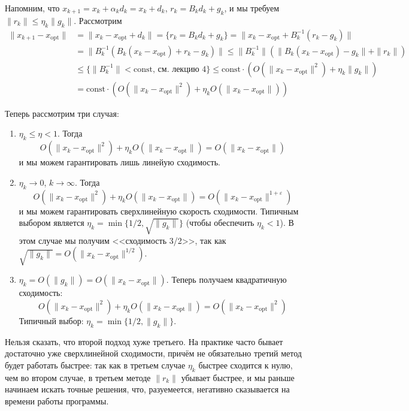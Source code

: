 \documentclass[a4paper, 12pt]{article}
\begin{document}
Напомним, что $x_{k+1} = x_k + \alpha_k d_k = x_k + d_k$, $r_k = B_kd_k + g_k$, и мы требуем $\|r_k\| \leq \eta_k\|g_k\|$. Рассмотрим
\begin{align}
    \|x_{k+1} - x_{\mathrm{opt}}\| &= \|x_k - x_{\mathrm{opt}} + d_k\|  
    = \{r_k = B_kd_k + g_k\} = \|x_k - x_{\mathrm{opt}} + B_k^{-1}(r_k - g_k)\| \\ &= \|B_k^{-1}(B_k(x_k - x_{\mathrm{opt}}) + r_k - g_k)\| 
    \leq \|B_k^{-1}\| (\|B_k(x_k - x_{\mathrm{opt}}) - g_k\| + \|r_k\|) \\ &\leq 
    \{\|B_k^{-1}\| < \mathrm{const} \text{, см. лекцию 4}\} \leq \mathrm{const} \cdot (O(\|x_k - x_{\mathrm{opt}}\|^2) + \eta_k \|g_k\|) \\ &= \mathrm{const} \cdot (O(\|x_k - x_{\mathrm{opt}}\|^2) + \eta_k O(\|x_k - x_{\mathrm{opt}}\|))
\end{align}

Теперь рассмотрим три случая:
\begin{enumerate}
    \item $\eta_k \leq \eta < 1$. Тогда $$O(\|x_k - x_{\mathrm{opt}}\|^2) + \eta_k O(\|x_k - x_{\mathrm{opt}}\|) = O(\|x_k - x_{\mathrm{opt}}\|)$$ и мы можем гарантировать лишь линейую сходимость.
    \item $\eta_k \to 0$, $k \to \infty$. Тогда 
    $$O(\|x_k - x_{\mathrm{opt}}\|^2) + \eta_k O(\|x_k - x_{\mathrm{opt}}\|) = O(\|x_k - x_{\mathrm{opt}}\|^{1 + \varepsilon})$$
    и мы можем гарантировать сверхлинейную скорость сходимости. Типичным выбором является $\eta_k = \min\{1/2, \sqrt{\|g_k\|}\}$ (чтобы обеспечить $\eta_k < 1$). В этом случае мы получим <<сходимость 3/2>>, так как $\sqrt{\|g_k\|} = O(\|x_k - x_{\mathrm{opt}}\|^{1/2})$.
    \item $\eta_k = O(\|g_k\|) = O(\|x_k - x_{\mathrm{opt}}\|)$. Теперь получаем квадратичную сходимость:
    $$O(\|x_k - x_{\mathrm{opt}}\|^2) + \eta_k O(\|x_k - x_{\mathrm{opt}}\|) = O(\|x_k - x_{\mathrm{opt}}\|^2)$$
    Типичный выбор: $\eta_k = \min\{1/2, \|g_k\|\}$.
\end{enumerate}

Нельзя сказать, что второй подход хуже третьего. На практике часто бывает достаточно уже сверхлинейной сходимости, причём не обязательно третий метод будет работать быстрее: так как в третьем случае $\eta_k$ быстрее сходится к нулю, чем во втором случае, в третьем методе $\|r_k\|$ убывает быстрее, и мы раньше начинаем искать точные решения, что, разуемеется, негативно сказывается на времени работы программы.
\end{document}
